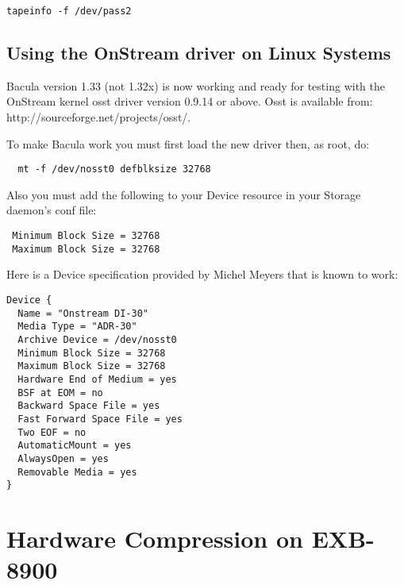 \footnotesize
\begin{verbatim}
tapeinfo -f /dev/pass2
\end{verbatim}
\normalsize

\label{onstream}

\subsection{Using the OnStream driver on Linux Systems}

Bacula version 1.33 (not 1.32x) is now working and ready for testing with the
OnStream kernel osst driver version 0.9.14 or above. Osst is available from: 
{http://sourceforge.net/projects/osst/}. 

To make Bacula work you must first load the new driver then, as root, do: 

\footnotesize
\begin{verbatim}
  mt -f /dev/nosst0 defblksize 32768
\end{verbatim}
\normalsize

Also you must add the following to your Device resource in your Storage
daemon's conf file: 

\footnotesize
\begin{verbatim}
 Minimum Block Size = 32768
 Maximum Block Size = 32768
\end{verbatim}
\normalsize

Here is a Device specification provided by Michel Meyers that is known to
work: 

\footnotesize
\begin{verbatim}
Device {
  Name = "Onstream DI-30"
  Media Type = "ADR-30"
  Archive Device = /dev/nosst0
  Minimum Block Size = 32768
  Maximum Block Size = 32768
  Hardware End of Medium = yes
  BSF at EOM = no
  Backward Space File = yes
  Fast Forward Space File = yes
  Two EOF = no
  AutomaticMount = yes
  AlwaysOpen = yes
  Removable Media = yes
}
\end{verbatim}
\normalsize

\section{Hardware Compression on EXB-8900}

